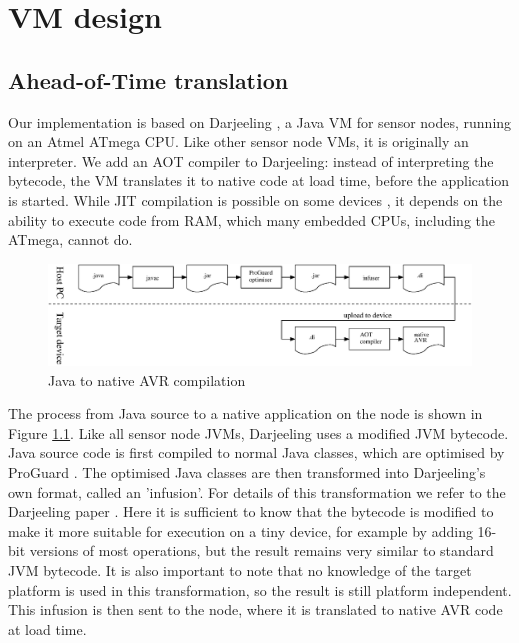 \chapter{VM design}


\section{Ahead-of-Time translation}
\label{sec-aot-translation}
Our implementation is based on Darjeeling \cite{Brouwers:2009cj}, a Java VM for sensor nodes, running on an Atmel ATmega CPU. Like other sensor node VMs, it is originally an interpreter. We add an AOT compiler to Darjeeling: instead of interpreting the bytecode, the VM translates it to native code at load time, before the application is started. While JIT compilation is possible on some devices \cite{Ellul:2012thesis}, it depends on the ability to execute code from RAM, which many embedded CPUs, including the ATmega, cannot do.

\begin{figure}[]
  \includegraphics[width=\linewidth]{compilation-process.eps}
  \caption{Java to native AVR compilation}
  \label{fig-translation-process}
\end{figure}


The process from Java source to a native application on the node is shown in Figure \ref{fig-translation-process}. Like all sensor node JVMs, Darjeeling uses a modified JVM bytecode. Java source code is first compiled to normal Java classes, which are optimised by ProGuard \cite{proguard}. The optimised Java classes are then transformed into Darjeeling's own format, called an 'infusion'. For details of this transformation we refer to the Darjeeling paper \cite{Brouwers:2009cj}. Here it is sufficient to know that the bytecode is modified to make it more suitable for execution on a tiny device, for example by adding 16-bit versions of most operations, but the result remains very similar to standard JVM bytecode. It is also important to note that no knowledge of the target platform is used in this transformation, so the result is still platform independent. This infusion is then sent to the node, where it is translated to native AVR code at load time.

